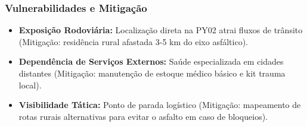 \subsubsection{Vulnerabilidades e
Mitigação}

\begin{itemize}
\tightlist
\item
  \textbf{Exposição Rodoviária:} Localização direta na PY02 atrai fluxos
  de trânsito (Mitigação: residência rural afastada 3-5 km do eixo
  asfáltico).
\item
  \textbf{Dependência de Serviços Externos:} Saúde especializada em
  cidades distantes (Mitigação: manutenção de estoque médico básico e
  kit trauma local).
\item
  \textbf{Visibilidade Tática:} Ponto de parada logístico (Mitigação:
  mapeamento de rotas rurais alternativas para evitar o asfalto em caso
  de bloqueios).
\end{itemize}


